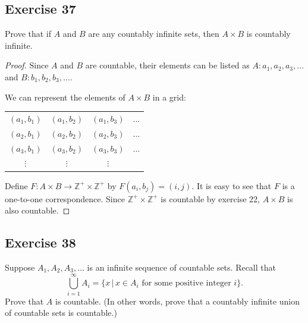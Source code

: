 \documentclass[14pt]{extarticle}
\newcommand{\Z}{\mathbb{Z}}
\begin{document}
\subsection{Exercise 37}
Prove that if $A$ and $B$ are any countably infinite sets, then \(A \times B\) is countably infinite.

\begin{proof}
Since $A$ and $B$ are countable, their elements can be listed as \(A: a_1, a_2, a_3, \ldots\) and \(B: b_1, b_2, b_3, \ldots\). 

We can represent the elements of \(A \times B\) in a grid:

\begin{center}
\begin{tabular}{cccc}
\((a_1, b_1)\) & \((a_1, b_2)\) & \((a_1, b_3)\) & \(\ldots\) \\
\((a_2, b_1)\) & \((a_2, b_2)\) & \((a_2, b_3)\) & \(\ldots\) \\
\((a_3, b_1)\) & \((a_3, b_2)\) & \((a_3, b_3)\) & \(\ldots\) \\
\(\vdots\) & \(\vdots\) & \(\vdots\) & \\
\end{tabular}
\end{center}

Define \(F: A \times B \to \Z^+ \times \Z^+\) by \(F(a_i, b_j) = (i, j)\). It is easy to see that $F$ is a one-to-one
correspondence. Since \(\Z^+ \times \Z^+\) is countable by exercise 22, \(A \times B\) is also countable.
\end{proof}

\subsection{Exercise 38}
Suppose \(A_1, A_2, A_3, \ldots\) is an infinite sequence of countable sets. Recall that 
\[
\bigcup_{i=1}^{\infty} A_i = \{x \, | \, x \in A_i \text{ for some positive integer } i\}. 
\]
Prove that $A$ is countable. (In other words, prove that a countably infinite union of countable sets is countable.)
\end{document}
